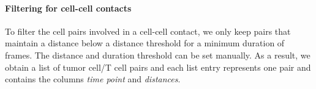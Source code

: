 \documentclass{report}
\begin{document}
%                              

\paragraph{Filtering for cell-cell contacts}
To filter the cell pairs involved in a cell-cell contact, we only keep pairs that maintain a distance below a distance threshold for a minimum duration of frames. The distance and duration threshold can be set manually. As a result, we obtain a list of tumor cell/T cell pairs and each list entry represents one pair and contains the columns \textit{time point} and \textit{distances}. 

%	
%
%
\end{document}
